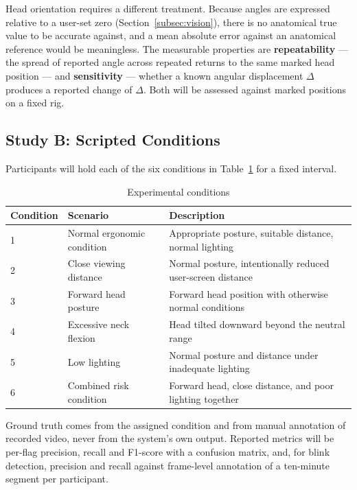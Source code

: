 Head orientation requires a different treatment. Because angles are expressed relative to a
user-set zero (Section~\ref{subsec:vision}), there is no anatomical true value to be accurate
against, and a mean absolute error against an anatomical reference would be meaningless. The
measurable properties are \textbf{repeatability} --- the spread of reported angle across repeated
returns to the same marked head position --- and \textbf{sensitivity} --- whether a known angular
displacement $\Delta$ produces a reported change of $\Delta$. Both will be assessed against marked
positions on a fixed rig.

\subsection{Study B: Scripted Conditions}

Participants will hold each of the six conditions in Table~\ref{tab:conditions} for a fixed interval.

\begin{table}[htbp]
\centering
\caption{Experimental conditions}
\label{tab:conditions}
\begin{tabular}{@{}llp{6.6cm}@{}}
\toprule
\textbf{Condition} & \textbf{Scenario} & \textbf{Description} \\
\midrule
1 & Normal ergonomic condition & Appropriate posture, suitable distance, normal lighting \\
2 & Close viewing distance     & Normal posture, intentionally reduced user-screen distance \\
3 & Forward head posture       & Forward head position with otherwise normal conditions \\
4 & Excessive neck flexion     & Head tilted downward beyond the neutral range \\
5 & Low lighting               & Normal posture and distance under inadequate lighting \\
6 & Combined risk condition    & Forward head, close distance, and poor lighting together \\
\bottomrule
\end{tabular}
\end{table}

Ground truth comes from the assigned condition and from manual annotation of recorded video, never
from the system's own output. Reported metrics will be per-flag precision, recall and F1-score with
a confusion matrix, and, for blink detection, precision and recall against frame-level annotation
of a ten-minute segment per participant.

